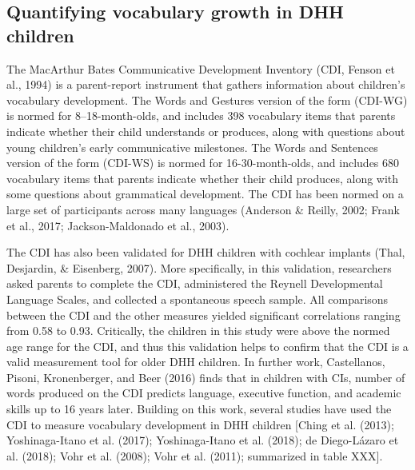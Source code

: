 \documentclass[english,man]{apa6}
\begin{document}
\hypertarget{quantifying-vocabulary-growth-in-dhh-children}{%
\subsection{Quantifying vocabulary growth in DHH children}\label{quantifying-vocabulary-growth-in-dhh-children}}

The MacArthur Bates Communicative Development Inventory (CDI, Fenson et al., 1994) is a parent-report instrument that gathers information about children's vocabulary development. The Words and Gestures version of the form (CDI-WG) is normed for 8--18-month-olds, and includes 398 vocabulary items that parents indicate whether their child understands or produces, along with questions about young children's early communicative milestones. The Words and Sentences version of the form (CDI-WS) is normed for 16-30-month-olds, and includes 680 vocabulary items that parents indicate whether their child produces, along with some questions about grammatical development. The CDI has been normed on a large set of participants across many languages (Anderson \& Reilly, 2002; Frank et al., 2017; Jackson-Maldonado et al., 2003).

The CDI has also been validated for DHH children with cochlear implants (Thal, Desjardin, \& Eisenberg, 2007). More specifically, in this validation, researchers asked parents to complete the CDI, administered the Reynell Developmental Language Scales, and collected a spontaneous speech sample. All comparisons between the CDI and the other measures yielded significant correlations ranging from 0.58 to 0.93. Critically, the children in this study were above the normed age range for the CDI, and thus this validation helps to confirm that the CDI is a valid measurement tool for older DHH children. In further work, Castellanos, Pisoni, Kronenberger, and Beer (2016) finds that in children with CIs, number of words produced on the CDI predicts language, executive function, and academic skills up to 16 years later. Building on this work, several studies have used the CDI to measure vocabulary development in DHH children {[}Ching et al. (2013); Yoshinaga-Itano et al. (2017); Yoshinaga-Itano et al. (2018); de Diego-Lázaro et al. (2018); Vohr et al. (2008); Vohr et al. (2011); summarized in table XXX{]}.
\end{document}
